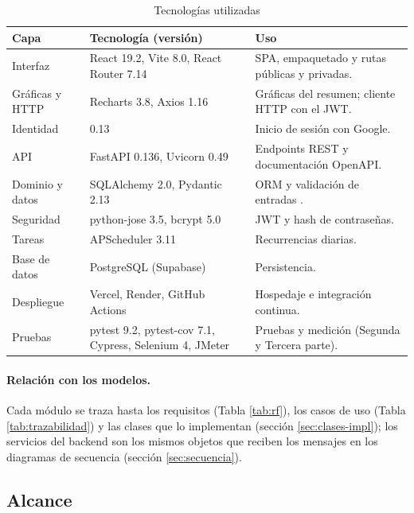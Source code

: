 \begin{table}[H]
\caption{Tecnologías utilizadas}
\label{tab:tecnologias}
\begin{tabularx}{\linewidth}{L{2.6cm} L{4.6cm} Y}
\toprule
Capa & Tecnología (versión) & Uso \\
\midrule
Interfaz & React 19.2, Vite 8.0, React Router 7.14 & SPA, empaquetado y rutas públicas y privadas. \\
Gráficas y HTTP & Recharts 3.8, Axios 1.16 & Gráficas del resumen; cliente HTTP con el JWT. \\
Identidad &  0.13 & Inicio de sesión con Google. \\
API & FastAPI 0.136, Uvicorn 0.49 & Endpoints REST y documentación OpenAPI. \\
Dominio y datos & SQLAlchemy 2.0, Pydantic 2.13 & ORM y validación de entradas \parencite{bayer2025,pydantic2025}. \\
Seguridad & python-jose 3.5, bcrypt 5.0 & JWT y hash de contraseñas. \\
Tareas & APScheduler 3.11 & Recurrencias diarias. \\
Base de datos & PostgreSQL (Supabase) & Persistencia. \\
Despliegue & Vercel, Render, GitHub Actions & Hospedaje e integración continua. \\
Pruebas & pytest 9.2, pytest-cov 7.1, Cypress, Selenium 4, JMeter & Pruebas y medición (Segunda y Tercera parte). \\
\bottomrule
\end{tabularx}
\end{table}

\paragraph{Relación con los modelos.} Cada módulo se traza hasta los requisitos (Tabla \ref{tab:rf}), los casos de uso (Tabla \ref{tab:trazabilidad}) y las clases que lo implementan (sección \ref{sec:clases-impl}); los servicios del backend son los mismos objetos que reciben los mensajes en los diagramas de secuencia (sección \ref{sec:secuencia}).

\subsection{Alcance}\label{sec:alcance}

